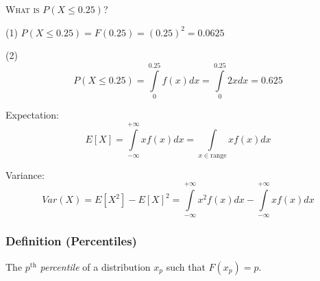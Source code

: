 \textsc{What is $ P(X\le 0.25) $?}

(1) $ P(X\le 0.25)=F(0.25)=(0.25)^2=0.0625 $

(2)
\[  P(X\le 0.25)=
\int\limits_{0}^{0.25} f(x) d{x} =\int\limits_{0}^{0.25} 2x d{x} =0.625 \]

\begin{defbox}
    Expectation:
    \[ E[X]=\int\limits_{-\infty}^{+\infty} xf(x) d{x} =
    \int\limits_{x\in\text{range}}^{} xf(x) d{x}  \]
\end{defbox}

\begin{defbox}
    Variance:
    \[ Var(X)=E[X^2]-E[X]^2=\int\limits_{-\infty}^{+\infty} x^2f(x) d{x}-
    \int\limits_{-\infty}^{+\infty} xf(x) d{x} \]
\end{defbox}

\begin{defbox}
    \subsubsection{Definition (Percentiles)}
    The $ p^\text{th} $ \emph{percentile} of a distribution $ x_p $ such that
    $ F(x_p)=p $.
\end{defbox}